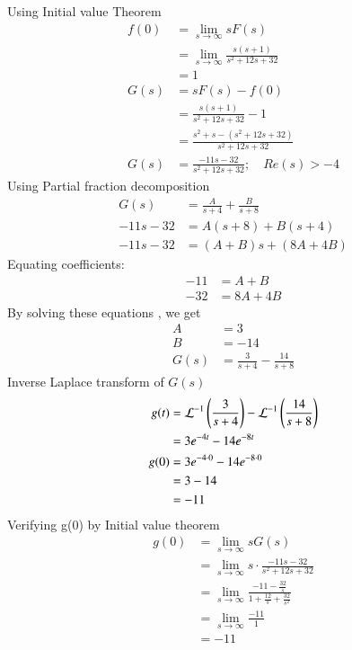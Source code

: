 \documentclass[journal,12pt,twocolumn]{IEEEtran}
\theoremstyle{remark}
\begin{document}
Using Initial value Theorem 
\begin{align}
    f(0) &= \lim_{s \to \infty} sF(s) \\
         &= \lim_{s \to \infty} \frac{s(s+1)}{s^2 + 12s + 32} \\
         &= 1 \\
    G(s) &= sF(s) - f(0) \\
         &= \frac{s(s+1)}{s^2 + 12s + 32} - 1 \\
         &= \frac{s^2 + s - (s^2 + 12s + 32)}{s^2 + 12s + 32} \\
         G(s) &= \frac{-11s - 32}{s^2 + 12s + 32} ; \quad Re(s) > -4 
\end{align}
Using Partial fraction decomposition 
\begin{align}
      G(s)   &= \frac{A}{s+4} + \frac{B}{s+8}  \\
    -11s - 32 &= A(s+8) + B(s+4) \\
    -11s - 32 &= (A + B)s + (8A + 4B)
\end{align}
Equating coefficients:
\begin{align}
     -11 &= A + B \\
    -32 &= 8A + 4B
\end{align}
By solving these equations , we get 
\begin{align}
    A &= 3 \\
    B &= -14 \\
    G(s) &=\frac{3}{s+4} - \frac{14}{s+8}
\end{align}
Inverse Laplace transform of $G(s)$ 
\begin{align}
g(t) &=\mathcal{L}^{-1}\left(\frac{3}{s+4}\right) -\mathcal{L}^{-1}\left(\frac{14}{s+8}\right) \\
   &= 3e^{-4t} - 14e^{-8t} \\
g(0) &= 3e^{-4 \cdot 0} - 14e^{-8 \cdot 0} \\
         &= 3 - 14 \\
         &= -11
\end{align}
Verifying g(0) by Initial value theorem
\begin{align}
    g(0) &= \lim_{s \to \infty} sG(s) \\
         &= \lim_{s \to \infty} s \cdot \frac{-11s - 32}{s^2 + 12s + 32} \\
         &= \lim_{s \to \infty} \frac{-11 - \frac{32}{s}}{1 + \frac{12}{s} + \frac{32}{s^2}} \\
         &= \lim_{s \to \infty} \frac{-11}{1} \\
         &= -11
\end{align}
\end{document}
